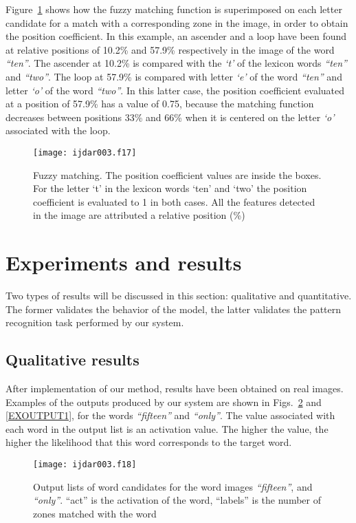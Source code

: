 \documentclass[ijdar]{svjour}
\begin{document}
Figure~\ref{FIGCOEFPOS} shows how the fuzzy matching function is superimposed on each letter candidate for a match with a corresponding zone in the image, in order to obtain the position coefficient.
In this example, an ascender and a loop have been found at relative positions of 10.2\% and 57.9\% respectively in the image of the word {\it ``ten''}.
The ascender at 10.2\% is compared with the {\it `t'} of the lexicon words {\it ``ten''} and {\it ``two''}.
The loop at 57.9\% is compared with letter {\it `e'} of the word {\it ``ten''} and letter {\it `o'} of the word {\it ``two''}.
In this latter case, the position coefficient evaluated at a position of 57.9\% has a value of 0.75, because the matching function decreases between positions 33\% and 66\% when it is centered on the letter {\it `o'} associated with the loop.


\begin{figure}%
\texttt{[image: ijdar003.f17]}%
\caption{Fuzzy matching. The position coefficient values are inside the
boxes. For the letter `t' in the lexicon words `ten' and `two' the
position coefficient is evaluated to 1 in both cases. All the features
detected in the image are attributed a relative position (\%)}
\label{FIGCOEFPOS}
\end{figure}

\section{Experiments and results}
\label{RESULTS}

Two types of results will be discussed in this section: qualitative and quantitative.
The former validates the behavior of the model, the latter validates the pattern recognition task performed by our system.

\subsection{Qualitative results}

After implementation of our method, results have been obtained on real images.
Examples of the outputs produced by our system are shown in Figs.~\ref{EXOUTPUT2} and \ref{EXOUTPUT1}, for the words {\it ``fifteen''} and {\it ``only''}.
The value associated with each word in the output list is an activation value.
The higher the value, the higher the likelihood that this word corresponds to the target word.

\begin{figure}%
\texttt{[image: ijdar003.f18]}%
\caption{Output lists of word candidates for the word images {\it
``fifteen''}, and {\it ``only''}. ``act'' is the activation of the word,
``labels'' is the number of zones matched with the word}
\label{EXOUTPUT2}
\end{figure}
\end{document}
